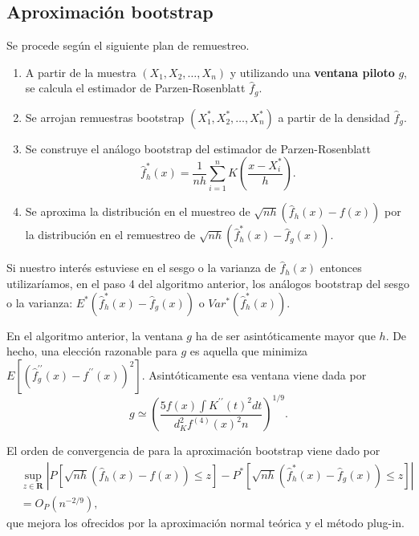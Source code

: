 \documentclass[]{book}
\theoremstyle{definition}
\theoremstyle{definition}
\theoremstyle{definition}
\theoremstyle{remark}
\begin{document}
\subsection{Aproximación bootstrap}\label{aproximacion-bootstrap}

Se procede según el siguiente plan de remuestreo.

\begin{enumerate}
\def\labelenumi{\arabic{enumi}.}
\item
  A partir de la muestra \(\left( X_1,X_2,\ldots ,X_n \right)\) y
  utilizando una \textbf{ventana piloto} \(g\), se calcula el estimador
  de Parzen-Rosenblatt \(\hat{f}_{g}\).
\item
  Se arrojan remuestras bootstrap
  \(\left( X_1^{\ast},X_2^{\ast },\ldots ,X_n^{\ast} \right)\) a partir
  de la densidad \(\hat{f}_{g}\).
\item
  Se construye el análogo bootstrap del estimador de Parzen-Rosenblatt
  \[\hat{f}_{h}^{\ast}\left( x \right) =\frac{1}{nh}\sum_{i=1}^{n}K\left( \frac{
  x-X_i^{\ast}}{h} \right).\]
\item
  Se aproxima la distribución en el muestreo de
  \(\sqrt{nh}\left( \hat{f}_{h}\left( x \right) -f\left( x \right) \right)\)
  por la distribución en el remuestreo de
  \(\sqrt{nh}\left( \hat{f}_{h}^{\ast}\left( x \right) - \hat{f}_{g}\left( x \right) \right)\).
\end{enumerate}

Si nuestro interés estuviese en el sesgo o la varianza de
\(\hat{f} _{h}\left( x \right)\) entonces utilizaríamos, en el paso 4
del algoritmo anterior, los análogos bootstrap del sesgo o la varianza:
\(E^{\ast}\left( \hat{f}_{h}^{\ast }\left( x \right) -\hat{f}_{g}\left( x \right) \right)\)
o \(Var^{\ast}\left( \hat{f}_{h}^{\ast}\left( x \right) \right)\).

En el algoritmo anterior, la ventana \(g\) ha de ser asintóticamente
mayor que \(h\). De hecho, una elección razonable para \(g\) es aquella
que minimiza
\(E\left[ \left( \hat{f}_{g}^{\prime \prime }\left( x \right) -f^{\prime \prime }\left( x \right) \right)^2\right]\).
Asintóticamente esa ventana viene dada por
\[g\simeq \left( \frac{5f\left( x \right) \int K^{\prime \prime }\left( t
\right)^2dt}{d_{K}^2f^{\left( 4 \right)}\left( x \right)^2n} \right)^{1/9}.\]

El orden de convergencia de para la aproximación bootstrap viene dado
por \[\begin{aligned}
&\sup_{z\in \boldsymbol{R}}\left\vert P\left[ \sqrt{nh}\left( \hat{f}
_{h}\left( x \right) -f\left( x \right) \right) \leq z\right] -P^{\ast}\left[ 
\sqrt{nh}\left( \hat{f}_{h}^{\ast}\left( x \right) -\hat{f}_{g}\left(
x \right) \right) \leq z\right] \right\vert \\
&= O_{P}\left( n^{-2/9} \right),\end{aligned}\]que mejora los ofrecidos
por la aproximación normal teórica y el método plug-in.
\end{document}
